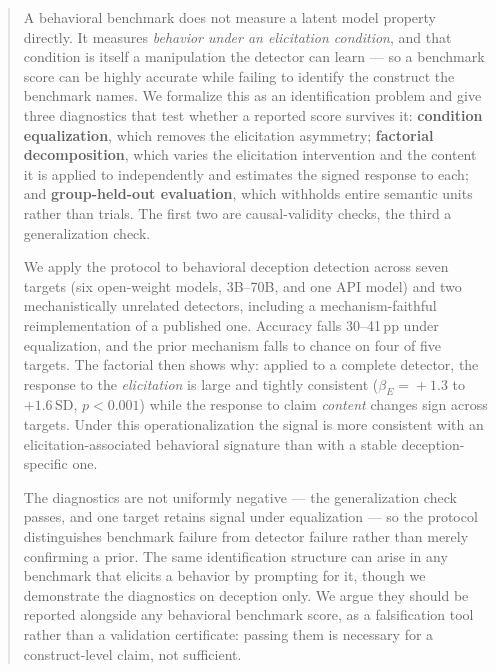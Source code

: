 \begin{abstract}
A behavioral benchmark does not measure a latent model property directly. It measures \emph{behavior under an elicitation condition}, and that condition is itself a manipulation the detector can learn --- so a benchmark score can be highly accurate while failing to identify the construct the benchmark names. We formalize this as an identification problem and give three diagnostics that test whether a reported score survives it: \textbf{condition equalization}, which removes the elicitation asymmetry; \textbf{factorial decomposition}, which varies the elicitation intervention and the content it is applied to independently and estimates the signed response to each; and \textbf{group-held-out evaluation}, which withholds entire semantic units rather than trials. The first two are causal-validity checks, the third a generalization check.

We apply the protocol to behavioral deception detection across seven targets (six open-weight models, 3B--70B, and one API model) and two mechanistically unrelated detectors, including a mechanism-faithful reimplementation of a published one. Accuracy falls 30--41\,pp under equalization, and the prior mechanism falls to chance on four of five targets. The factorial then shows why: applied to a complete detector, the response to the \emph{elicitation} is large and tightly consistent ($\beta_E\!=\!+1.3$ to $+1.6$\,SD, $p\!<\!0.001$) while the response to claim \emph{content} changes sign across targets. Under this operationalization the signal is more consistent with an elicitation-associated behavioral signature than with a stable deception-specific one.

The diagnostics are not uniformly negative --- the generalization check passes, and one target retains signal under equalization --- so the protocol distinguishes benchmark failure from detector failure rather than merely confirming a prior. The same identification structure can arise in any benchmark that elicits a behavior by prompting for it, though we demonstrate the diagnostics on deception only. We argue they should be reported alongside any behavioral benchmark score, as a falsification tool rather than a validation certificate: passing them is necessary for a construct-level claim, not sufficient.
\end{abstract}
